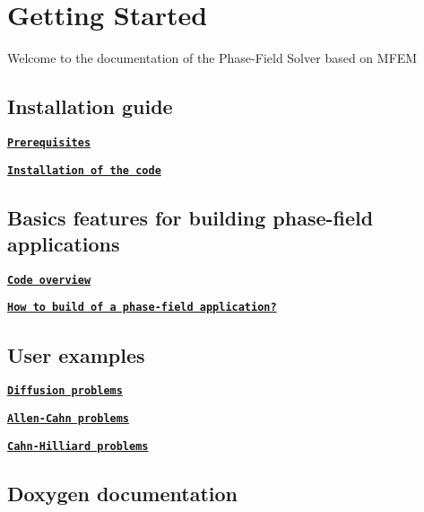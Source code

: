 \hypertarget{index___quick}{}\section{Getting Started}\label{index___quick}
Welcome to the documentation of the Phase-\/\+Field Solver based on M\+F\+EM\hypertarget{index__start}{}\subsection{Installation guide}\label{index__start}

\begin{DoxyEnumerate}
\item \href{__install.html}{\tt {\bfseries Prerequisites}}
\item \href{__install.html}{\tt {\bfseries Installation of the code}}
\end{DoxyEnumerate}\hypertarget{index__use}{}\subsection{Basics features for building phase-\/field applications}\label{index__use}

\begin{DoxyEnumerate}
\item \href{__overview.html}{\tt {\bfseries Code overview}}
\item \href{__howto.html}{\tt {\bfseries How to build of a phase-\/field application?}}
\end{DoxyEnumerate}\hypertarget{index__user}{}\subsection{User examples}\label{index__user}

\begin{DoxyEnumerate}
\item \href{__diffusion.html}{\tt {\bfseries Diffusion problems}}
\item \href{__allencahn.html}{\tt {\bfseries Allen-\/\+Cahn problems}}
\item \href{__cahnhilliard.html}{\tt {\bfseries Cahn-\/\+Hilliard problems}}
\end{DoxyEnumerate}\hypertarget{index__doxygen}{}\subsection{Doxygen documentation}\label{index__doxygen}

